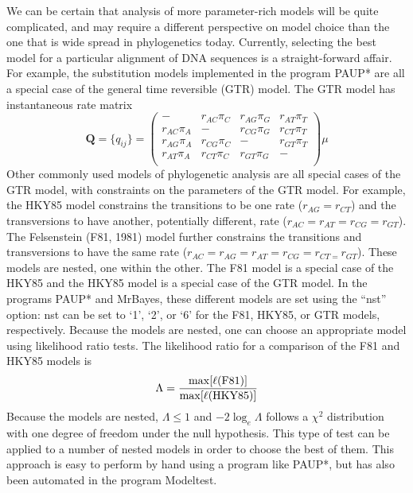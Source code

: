 \documentclass{svmult}
\begin{document}
We can be certain that analysis of more parameter-rich models will be quite complicated, and may
require a different perspective on model choice than the one that is wide spread in phylogenetics
today. Currently, selecting the best model for a particular alignment of DNA sequences is a
straight-forward affair. For example, the substitution models implemented in the program PAUP* are
all a special case of the general time reversible (GTR) model. The GTR model has instantaneous rate
matrix
\begin{equation*}
{\mathbf Q} = \{q_{ij}\} = \left( \begin{array}{cccc}
-                &  r_{AC} \pi_C & r_{AG} \pi_G & r_{AT} \pi_T \\
r_{AC} \pi_A & -                 & r_{CG} \pi_G & r_{CT} \pi_T \\
r_{AG} \pi_A & r_{CG} \pi_C & -                 & r_{GT} \pi_T \\
r_{AT} \pi_A & r_{CT} \pi_C & r_{GT} \pi_G & -                 \\
\end{array} \right) \mu
\end{equation*}
Other commonly used models of phylogenetic analysis are all special cases of the GTR model, with
constraints on the parameters of the GTR model.  For example, the HKY85 model constrains the
transitions to be one rate ($r_{AG} = r_{CT}$) and the transversions to have another, potentially
different, rate ($r_{AC} = r_{AT} = r_{CG} = r_{GT}$). The Felsenstein (F81, 1981) model further
constrains the transitions and transversions to have the same rate ($r_{AC} = r_{AG} = r_{AT} =
r_{CG} =  r_{CT = }r_{GT}$). These models are nested, one within the other. The F81 model is a
special case of the HKY85 and the HKY85 model is a special case of the GTR model.  In the programs
PAUP* and MrBayes, these different models are set using the ``nst'' option: nst can be set to `1',
`2', or `6' for the F81, HKY85, or GTR models, respectively.  Because the models are nested, one
can choose an appropriate model using likelihood ratio tests. The likelihood ratio for a comparison
of the F81 and HKY85 models is
$$
\Lambda = {\max[\ell(\mbox{F81})] \over \max[\ell(\mbox{HKY85})]}
$$
Because the models are nested, $\Lambda \leq 1$ and $-2\log_e \Lambda$ follows a $\chi^2$
distribution with one degree of freedom under the null hypothesis. This type of test can be applied
to a number of nested models in order to choose the best of them. This approach is easy to perform
by hand using a program like PAUP*, but has also been automated in the program Modeltest. 
\end{document}
